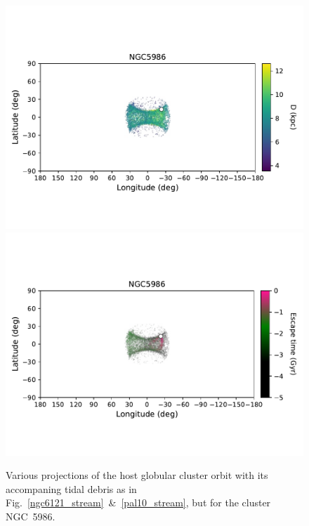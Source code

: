 \begin{figure}
\begin{center}
                    \includegraphics[clip=true, trim = 0mm 20mm 0mm 10mm, width=\columnwidth]{images/PII_individual_NGC5986_NGC5986_LB_D.pdf}
                    \includegraphics[clip=true, trim = 0mm 20mm 0mm 10mm, width=\columnwidth]{images/PII_individual_NGC5986_NGC5986_LB_tesc.pdf}
                \end{center}
                \caption[]{Various projections of the host globular cluster orbit with its accompaning tidal debris as in Fig.~\ref{ngc6121_stream}~\&~\ref{pal10_stream}, but for the cluster NGC~5986.\label{ngc5986_stream}}
            \end{figure}   
            \onecolumn  
            
